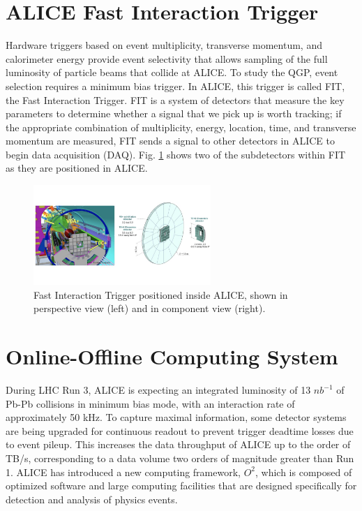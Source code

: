 \section{ALICE Fast Interaction Trigger}
Hardware triggers based on event multiplicity, transverse momentum, and calorimeter energy provide
event selectivity that allows sampling of the full luminosity of particle beams that collide at ALICE. To study the QGP, event selection requires a minimum bias trigger. In ALICE, this trigger is called FIT, the Fast Interaction Trigger. FIT is a system of detectors that measure the key parameters to determine whether a signal that we pick up is worth tracking; if the appropriate combination of multiplicity, energy, location, time, and transverse momentum are measured, FIT sends a signal to other detectors in ALICE to begin data acquisition (DAQ). Fig. \ref{fig:FIT_IN_ALICE} shows two of the subdetectors within FIT as they are positioned in ALICE. 

\begin{figure}[H]
    \centering
    \includegraphics[width=0.6\textwidth]{figures/ALICE/FIT_in_ALICE.jpg}
    \caption{Fast Interaction Trigger positioned inside ALICE, shown in perspective view (left) and in component view (right).}
    \label{fig:FIT_IN_ALICE}
\end{figure}

\section{Online-Offline Computing System}

During LHC Run 3, ALICE is expecting an integrated luminosity of 13 ${nb}^{-1}$ of Pb-Pb collisions in minimum bias mode, with an interaction rate of approximately 50 kHz. To capture maximal information, some detector systems are being upgraded for continuous readout to prevent trigger deadtime losses due to event pileup. This increases the data throughput of ALICE up to the order of TB/s, corresponding to a data volume two orders of magnitude greater than Run 1. ALICE has introduced a new computing framework, $O^2$, which is composed of optimized software and large computing facilities that are designed specifically for detection and analysis of physics events.


